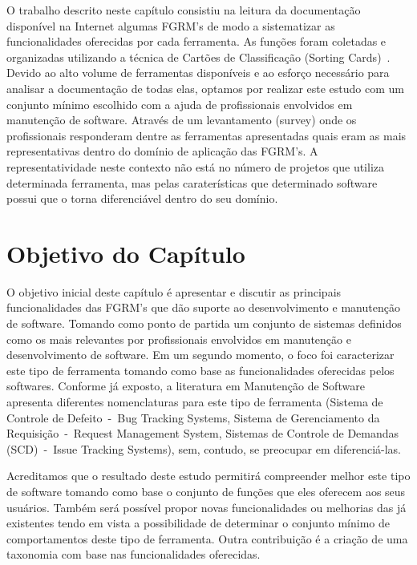 O trabalho descrito neste capítulo consistiu na leitura da documentação
disponível na Internet algumas FGRM's de modo a sistematizar as funcionalidades
oferecidas por cada ferramenta.  As funções foram coletadas e organizadas
utilizando a técnica de Cartões de Classificação (Sorting Cards)~\cite{5070993,
	rugg2005sorting}. Devido ao alto volume de ferramentas disponíveis e ao
esforço necessário para analisar a documentação de todas elas, optamos por
realizar este estudo com um conjunto mínimo escolhido com a ajuda de
profissionais envolvidos em manutenção de software. Através de um levantamento
(survey) onde os profissionais responderam dentre as ferramentas apresentadas
quais eram as mais representativas dentro do domínio de aplicação das FGRM's. A
representatividade neste contexto não está no número de projetos que utiliza
determinada ferramenta, mas pelas caraterísticas que determinado software possui
que o torna diferenciável dentro do seu domínio.

\section{Objetivo do Capítulo}
\label{sec:objetivo_do_capítulo}

O objetivo inicial deste capítulo é apresentar e discutir as principais
funcionalidades das FGRM's que dão suporte ao desenvolvimento e manutenção de
software. Tomando como ponto de partida um conjunto de sistemas definidos como
os mais relevantes por profissionais envolvidos em manutenção e desenvolvimento
de software. Em um segundo momento, o foco foi caracterizar este tipo de
ferramenta tomando como base as funcionalidades oferecidas pelos softwares.
Conforme já exposto, a literatura em Manutenção de Software apresenta diferentes
nomenclaturas para este tipo de ferramenta (Sistema de Controle de Defeito~-~Bug
Tracking Systems, Sistema de Gerenciamento da Requisição~-~Request Management
System, Sistemas de Controle de Demandas (SCD)~-~Issue Tracking Systems), sem,
contudo, se preocupar em diferenciá-las.

Acreditamos que o resultado deste estudo permitirá compreender melhor este tipo
de software tomando como base o conjunto de funções que eles oferecem aos seus
usuários. Também será possível propor novas funcionalidades ou melhorias das já
existentes tendo em vista a possibilidade de determinar o conjunto mínimo de
comportamentos deste tipo de ferramenta. Outra contribuição é a
criação de uma taxonomia com base nas funcionalidades oferecidas.

